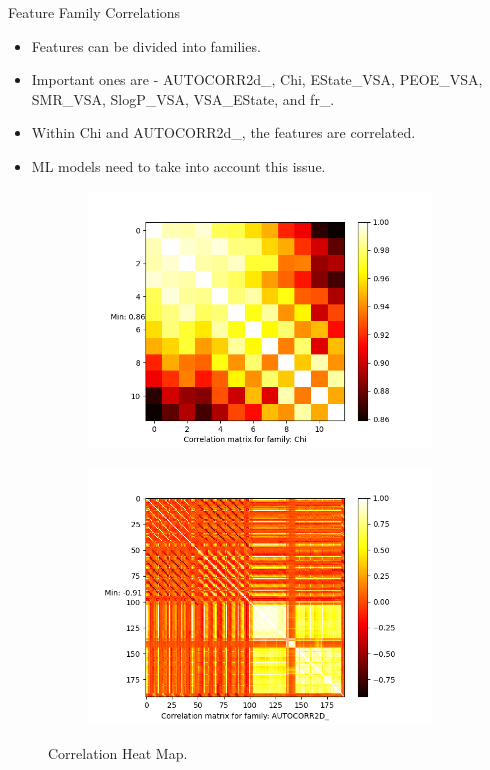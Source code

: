 \documentclass{beamer}
\begin{document}
\begin{frame}[t]{Feature Family Correlations}
\begin{itemize}
\item Features can be divided into families.
\item Important ones are - AUTOCORR2d\_, Chi, EState\_VSA,  PEOE\_VSA,  SMR\_VSA,  SlogP\_VSA,  VSA\_EState, and fr\_.
\item Within Chi and AUTOCORR2d\_, the features are correlated.
\item ML models need to take into account this issue.
\end{itemize}
\begin{figure}[htb]
    \begin{subfigure}[b]{0.49\textwidth}
         \centering
         \includegraphics[scale=0.25]{images/correlationChi}
        \label{fig:correlationChi}
     \end{subfigure}
     \hfill
    \begin{subfigure}[b]{0.49\textwidth}
         \centering
         \includegraphics[scale=0.25]{images/correlationAUTOCORR2D}
        \label{fig:correlationfr}
     \end{subfigure}
     \caption{Correlation Heat Map.}
     \label{fig:correlationheatmap}
\end{figure}
\end{frame}
\end{document}
